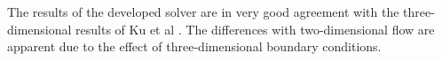 \documentclass[12pt,a4paper,fleqn]{article}
\begin{document}
The results of the developed solver are in very good agreement with the three-dimensional results of Ku et al \cite{Ku:1987:PMS:33136.33145}. The differences with two-dimensional flow are apparent due to the effect of three-dimensional boundary conditions.



\end{document}
